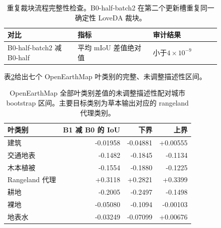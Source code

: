 \begin{table}[h]
\centering
\caption{重复裁块流程完整性检查。B0-half-batch2 在第二个更新槽重复同一确定性 LoveDA 裁块。}
\label{tab:batch_integrity}
\begin{tabular}{@{}p{0.28\linewidth}p{0.30\linewidth}p{0.27\linewidth}@{}}
\toprule
对比 & 指标 & 审计结果 \\
\midrule
B0-half-batch2 减 B0-half & 平均 mIoU 差值绝对值 & 小于\(4\times10^{-9}\) \\
\bottomrule
\end{tabular}
\end{table}

表\ref{tab:all_leaf_contrasts}给出七个 OpenEarthMap 叶类别的完整、未调整描述性区间。
\begin{table}[h]
\centering
\caption{OpenEarthMap 全部叶类别差值的未调整描述性配对城市 bootstrap 区间。主要目标类别为草本输出对应的 rangeland 代理类别。}
\label{tab:all_leaf_contrasts}
\begin{tabular}{lrrr}
\toprule
叶类别 & B1 减 B0 的 IoU & 下界 & 上界 \\
\midrule
建筑 & -0.01958 & -0.04881 & +0.00555 \\
交通地表 & -0.1482 & -0.1845 & -0.1134 \\
木本植被 & -0.1554 & -0.1880 & -0.1225 \\
Rangeland 代理 & +0.3118 & +0.2821 & +0.3399 \\
耕地 & -0.2005 & -0.2497 & -0.1498 \\
裸地 & -0.05080 & -0.1094 & -0.00103 \\
地表水 & -0.03249 & -0.07099 & +0.00676 \\
\bottomrule
\end{tabular}
\end{table}
